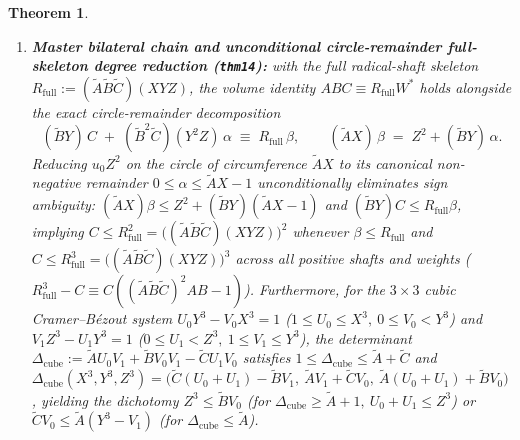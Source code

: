 \documentclass[11pt,a4paper]{article}
\theoremstyle{plain}
\newtheorem{theorem}{Theorem}[section]
\theoremstyle{definition}
\begin{document}
\begin{theorem}
\begin{enumerate}[label=\textbf{(\roman*)},leftmargin=*]
  \begin{equation}
    \label{eq:ms-wronskian}
    W^* \;:=\; A B^* - B A^* \;\equiv\; X^2 Y^2 Z^2,\qquad
    -\det\mathcal{W}_{\mathrm{MS}} \;\equiv\; X^4 + Y^4 + Z^4,
  \end{equation}
  and bilateral Cramer convergence $w X^2 + \widetilde{B}\gamma = D_{\mathrm{clash}}Z$, $v X^2 + \widetilde{C}\beta = D_{\mathrm{clash}}Y$ ($D_{\mathrm{clash}} = \widetilde{C}w\beta - \widetilde{B}v\gamma$).
\item \textbf{Master bilateral chain and unconditional circle-remainder full-skeleton degree reduction (\texttt{thm14}):}
  with the full radical-shaft skeleton $R_{\mathrm{full}} := (\widetilde{A}\widetilde{B}\widetilde{C})(X Y Z)$, the volume identity $A B C \equiv R_{\mathrm{full}} W^*$ holds alongside the exact circle-remainder decomposition
  \begin{equation}
    \label{eq:circle-remainder-rfull}
    (\widetilde{B}Y)\,C \;+\; (\widetilde{B}^2\widetilde{C})(Y^2 Z)\,\alpha \;\equiv\; R_{\mathrm{full}}\,\beta,\qquad
    (\widetilde{A}X)\,\beta \;=\; Z^2 + (\widetilde{B}Y)\,\alpha.
  \end{equation}
  Reducing $u_0 Z^2$ on the circle of circumference $\widetilde{A}X$ to its canonical non-negative remainder $0\le\alpha\le\widetilde{A}X-1$ unconditionally eliminates sign ambiguity: $(\widetilde{A}X)\beta \le Z^2 + (\widetilde{B}Y)(\widetilde{A}X-1)$ and $(\widetilde{B}Y)C \le R_{\mathrm{full}}\beta$, implying $C \le R_{\mathrm{full}}^2 = \bigl((\widetilde{A}\widetilde{B}\widetilde{C})(X Y Z)\bigr)^2$ whenever $\beta\le R_{\mathrm{full}}$ and $C \le R_{\mathrm{full}}^3 = \bigl((\widetilde{A}\widetilde{B}\widetilde{C})(X Y Z)\bigr)^3$ across all positive shafts and weights ($R_{\mathrm{full}}^3 - C \equiv C((\widetilde{A}\widetilde{B}\widetilde{C})^2 A B - 1)$). Furthermore, for the $3\times 3$ cubic Cramer--B\'ezout system $U_0 Y^3 - V_0 X^3 = 1$ ($1\le U_0\le X^3,\ 0\le V_0 < Y^3$) and $V_1 Z^3 - U_1 Y^3 = 1$ ($0\le U_1 < Z^3,\ 1\le V_1\le Y^3$), the determinant $\Delta_{\mathrm{cube}} := \widetilde{A}U_0 V_1 + \widetilde{B}V_0 V_1 - \widetilde{C}U_1 V_0$ satisfies $1 \le \Delta_{\mathrm{cube}} \le \widetilde{A} + \widetilde{C}$ and $\Delta_{\mathrm{cube}}(X^3, Y^3, Z^3) = \bigl(\widetilde{C}(U_0+U_1)-\widetilde{B}V_1,\ \widetilde{A}V_1+\widetilde{C}V_0,\ \widetilde{A}(U_0+U_1)+\widetilde{B}V_0\bigr)$, yielding the dichotomy $Z^3 \le \widetilde{B}V_0$ (for $\Delta_{\mathrm{cube}}\ge\widetilde{A}+1,\ U_0+U_1\le Z^3$) or $\widetilde{C}V_0 \le \widetilde{A}(Y^3-V_1)$ (for $\Delta_{\mathrm{cube}}\le\widetilde{A}$).

\end{enumerate}
\end{theorem}
\end{document}

